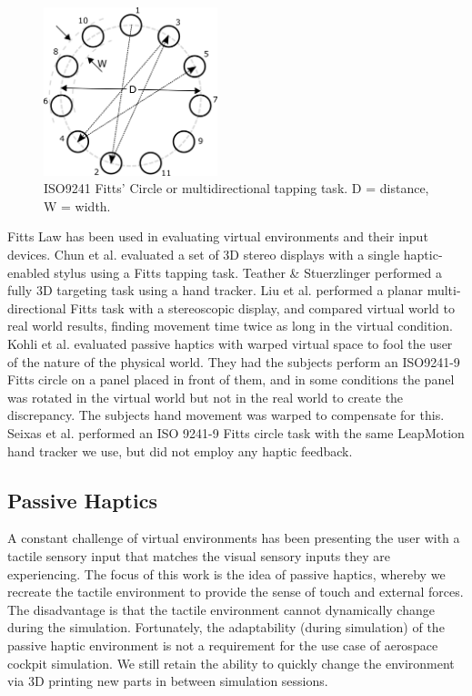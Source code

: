 \documentclass[]{aiaa-tc}%
\begin{document}
\begin{figure}[htb]
  \centering
  \includegraphics[width=0.45\textwidth]{figures/iso9241.png}
  \caption{ISO9241 Fitts' Circle or multidirectional tapping task. D = distance, W = width.}
  \label{fig:circle}
\end{figure}

Fitts Law has been used in evaluating virtual environments and their input devices.
Chun et al.\cite{chun} evaluated a set of 3D stereo displays with a single haptic-enabled stylus using a Fitts tapping task.
Teather \& Stuerzlinger\cite{teather} performed a fully 3D targeting task using a hand tracker.
Liu et al.\cite{liu} performed a planar multi-directional Fitts task with a stereoscopic display, and compared virtual world to real world results, finding movement time twice as long in the virtual condition.
Kohli et al.\cite{kohli} evaluated passive haptics with warped virtual space to fool the user of the nature of the physical world.
They had the subjects perform an ISO9241-9 Fitts circle on a panel placed in front of them, and in some conditions the panel was rotated in the virtual world but not in the real world to create the discrepancy.
The subjects hand movement was warped to compensate for this.
Seixas et al.\cite{seixas} performed an ISO 9241-9 Fitts circle task with the same LeapMotion hand tracker we use, but did not employ any haptic feedback.

\subsection{Passive Haptics}
A constant challenge of virtual environments has been presenting the user with a tactile sensory input that matches the visual sensory inputs they are experiencing.
The focus of this work is the idea of passive haptics, whereby we recreate the tactile environment to provide the sense of touch and external forces.
The disadvantage is that the tactile environment cannot dynamically change during the simulation.
Fortunately, the adaptability (during simulation) of the passive haptic environment is not a requirement for the use case of aerospace cockpit simulation.
We still retain the ability to quickly change the environment via 3D printing new parts in between simulation sessions.
\end{document}
